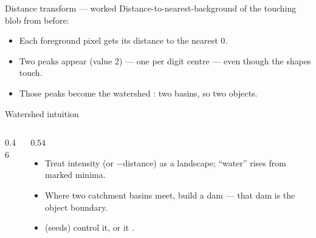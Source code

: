 \documentclass[10pt,aspectratio=169]{beamer}
\begin{document}
\begin{frame}{Distance transform --- worked}
  Distance-to-nearest-background of the touching blob from before:
  \begin{center}
  \end{center}
  \begin{itemize}
    \item Each foreground pixel gets its distance to the nearest 0.
    \item \alert{Two peaks} appear (value 2) --- one per digit centre --- even though the
          shapes touch.
    \item Those peaks become the watershed : two basins, so two objects.
  \end{itemize}
\end{frame}

\begin{frame}{Watershed intuition}
  \begin{columns}[T]
    \begin{column}{0.46\textwidth}
    \end{column}
    \begin{column}{0.54\textwidth}
      \begin{itemize}
        \item Treat intensity (or $-$distance) as a landscape; ``water'' rises from marked minima.
        \item Where two catchment basins meet, build a dam --- that dam is the object boundary.
        \item {} (seeds) control it, or it .
      \end{itemize}
    \end{column}
  \end{columns}
\end{frame}
\end{document}
